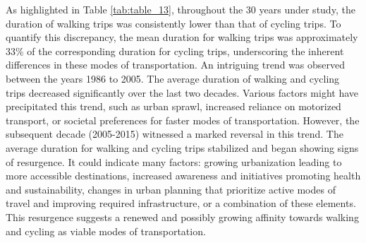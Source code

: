 \documentclass[
11pt, %
oneside, %
english, %
singlespacing, %
]{macthesis} %
\begin{document}
As highlighted in Table \ref{tab:table_13}, throughout the 30 years under study, the duration of walking trips was consistently lower than that of cycling trips. To quantify this discrepancy, the mean duration for walking trips was approximately 33\% of the corresponding duration for cycling trips, underscoring the inherent differences in these modes of transportation. An intriguing trend was observed between the years 1986 to 2005. The average duration of walking and cycling trips decreased significantly over the last two decades. Various factors might have precipitated this trend, such as urban sprawl, increased reliance on motorized transport, or societal preferences for faster modes of transportation. However, the subsequent decade (2005-2015) witnessed a marked reversal in this trend. The average duration for walking and cycling trips stabilized and began showing signs of resurgence. It could indicate many factors: growing urbanization leading to more accessible destinations, increased awareness and initiatives promoting health and sustainability, changes in urban planning that prioritize active modes of travel and improving required infrastructure, or a combination of these elements. This resurgence suggests a renewed and possibly growing affinity towards walking and cycling as viable modes of transportation.
\end{document}
